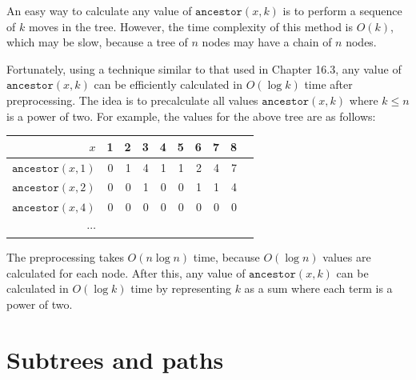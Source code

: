An easy way to calculate any value of $\texttt{ancestor}(x,k)$
is to perform a sequence of $k$ moves in the tree.
However, the time complexity of this method
is $O(k)$, which may be slow, because a tree of $n$
nodes may have a chain of $n$ nodes.

Fortunately, using a technique similar to that
used in Chapter 16.3, any value of $\texttt{ancestor}(x,k)$
can be efficiently calculated in $O(\log k)$ time
after preprocessing.
The idea is to precalculate all values $\texttt{ancestor}(x,k)$
where $k \le n$ is a power of two.
For example, the values for the above tree
are as follows:

\begin{center}
\begin{tabular}{r|rrrrrrrrr}
$x$ & 1 & 2 & 3 & 4 & 5 & 6 & 7 & 8 \\
\hline
$\texttt{ancestor}(x,1)$ & 0 & 1 & 4 & 1 & 1 & 2 & 4 & 7 \\
$\texttt{ancestor}(x,2)$ & 0 & 0 & 1 & 0 & 0 & 1 & 1 & 4 \\
$\texttt{ancestor}(x,4)$ & 0 & 0 & 0 & 0 & 0 & 0 & 0 & 0 \\
$\cdots$ \\
\end{tabular}
\end{center}

The preprocessing takes $O(n \log n)$ time,
because $O(\log n)$ values are calculated for each node.
After this, any value of $\texttt{ancestor}(x,k)$ can be calculated
in $O(\log k)$ time by representing $k$
as a sum where each term is a power of two.

\section{Subtrees and paths}


